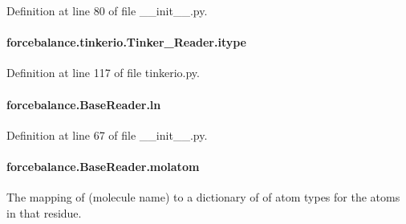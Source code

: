 Definition at line 80 of file \-\_\-\-\_\-init\-\_\-\-\_\-.\-py.

\hypertarget{classforcebalance_1_1tinkerio_1_1Tinker__Reader_a248491ef24b63a0c027d66d75e80e70e}{
\paragraph[{itype}]{\setlength{\rightskip}{0pt plus 5cm}forcebalance.\-tinkerio.\-Tinker\-\_\-\-Reader.\-itype}}\label{classforcebalance_1_1tinkerio_1_1Tinker__Reader_a248491ef24b63a0c027d66d75e80e70e}


Definition at line 117 of file tinkerio.\-py.

\hypertarget{classforcebalance_1_1BaseReader_a80c8e3bea212600742968aa8669e557b}{
\paragraph[{ln}]{\setlength{\rightskip}{0pt plus 5cm}forcebalance.\-Base\-Reader.\-ln\hspace{0.3cm}{\ttfamily [inherited]}}}\label{classforcebalance_1_1BaseReader_a80c8e3bea212600742968aa8669e557b}


Definition at line 67 of file \-\_\-\-\_\-init\-\_\-\-\_\-.\-py.

\hypertarget{classforcebalance_1_1BaseReader_ab444c213e15929253dd73395ac5f19fc}{
\paragraph[{molatom}]{\setlength{\rightskip}{0pt plus 5cm}forcebalance.\-Base\-Reader.\-molatom\hspace{0.3cm}{\ttfamily [inherited]}}}\label{classforcebalance_1_1BaseReader_ab444c213e15929253dd73395ac5f19fc}


The mapping of (molecule name) to a dictionary of of atom types for the atoms in that residue. 

